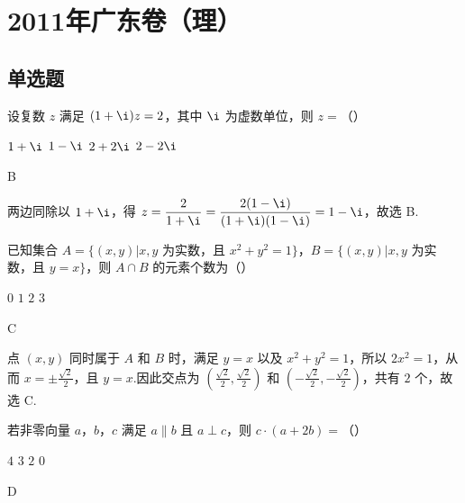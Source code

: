 \chapter{2011年广东卷（理）}

\section{单选题}

\begin{problem}
设复数 \(z\) 满足 \((1 + \i)z = 2\)，其中 \(\i\) 为虚数单位，则 \(z =\)（\quad）

\choices
    {\(1 + \i\)}
    {\(1 - \i\)}
    {\(2 + 2\i\)}
    {\(2 - 2\i\)}
\end{problem}

\begin{answer}
B
\end{answer}

\begin{solution}
两边同除以 \(1+\i\)，得 \(z=\dfrac{2}{1+\i}=\dfrac{2(1-\i)}{(1+\i)(1-\i)}=1-\i\)，故选 B.
\end{solution}

\begin{problem}
已知集合 \(A = \{(x, y) | x, y\) 为实数，且 \(x^2 + y^2 = 1\}\)，\(B = \{(x, y) | x, y\) 为实数，且 \(y = x\}\)，则 \(A \cap B\) 的元素个数为（\quad）

\choices
    {\(0\)}
    {\(1\)}
    {\(2\)}
    {\(3\)}
\end{problem}

\begin{answer}
C
\end{answer}

\begin{solution}
点 \((x,y)\) 同时属于 \(A\) 和 \(B\) 时，满足 \(y=x\) 以及 \(x^2+y^2=1\)，所以 \(2x^2=1\)，从而 \(x=\pm\frac{\sqrt{2}}{2}\)，且 \(y=x\).因此交点为 \(\left(\frac{\sqrt{2}}{2},\frac{\sqrt{2}}{2}\right)\) 和 \(\left(-\frac{\sqrt{2}}{2},-\frac{\sqrt{2}}{2}\right)\)，共有 \(2\) 个，故选 C.
\end{solution}

\begin{problem}
若非零向量 \(a\)，\(b\)，\(c\) 满足 \(a \parallel b\) 且 \(a \perp c\)，则 \(c \cdot (a + 2b) =\)（\quad）

\choices
    {\(4\)}
    {\(3\)}
    {\(2\)}
    {\(0\)}
\end{problem}

\begin{answer}
D
\end{answer}

